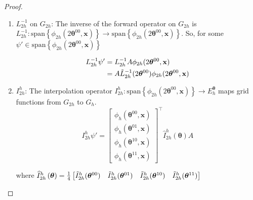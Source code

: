 \documentclass[12pt]{article}
\begin{document}
\begin{proof}
\begin{enumerate}
\begin{align*}
    I^{2h}_h \psi(\mathbf{x}) &= \left(\Tilde{I}_h^{2h}(\boldsymbol{\theta}^{00})A^{00}   +  \Tilde{I}_h^{2h}(\boldsymbol{\theta}^{01})A^{01} + \Tilde{I}_h^{2h}(\boldsymbol{\theta}^{10})A^{10} + \Tilde{I}_h^{2h}(\boldsymbol{\theta}^{11})A^{11} \right) \phi_{2h}(2\boldsymbol{\theta}^{00}, \mathbf{x}) \\
    &= \widehat{I}^{2h}_h(\boldsymbol{\theta}) \begin{bmatrix}
        A^{00}\\
        A^{01}\\
        A^{10}\\
        A^{11}
    \end{bmatrix} \phi_{2h}(2\boldsymbol{\theta}^{00}, \mathbf{x})
\end{align*}
 where $\widehat{I}^{2h}_h(\boldsymbol{\theta}) = \begin{bmatrix}
     \Tilde{I}_h^{2h}(\boldsymbol{\theta}^{00}) & \Tilde{I}_h^{2h}(\boldsymbol{\theta}^{01}) & \Tilde{I}_h^{2h}(\boldsymbol{\theta}^{10}) & \Tilde{I}_h^{2h}(\boldsymbol{\theta}^{11})
 \end{bmatrix}$
    \item $L_{2h}^{-1}$ on $G_{2h}$: The inverse of the forward operator on $G_{2h}$ is $L_{2h}^{-1}: \text{span}\left\{\phi_{2h}(2\boldsymbol{\theta}^{00}, \mathbf{x})\right\}\to \text{span}\left\{\phi_{2h}(2\boldsymbol{\theta}^{00}, \mathbf{x})\right\}$. So, for some $\psi' \in  \text{span}\left\{\phi_{2h}(2\boldsymbol{\theta}^{00}, \mathbf{x})\right\} $ 

\begin{align*}
    L_{2h}^{-1} \psi' &= L_{2h}^{-1}A \phi_{2h}(2\boldsymbol{\theta}^{00}, \mathbf{x}) \\
    &= A \Tilde{L}_{2h}^{-1}(2\boldsymbol{\theta}^{00})\phi_{2h}(2\boldsymbol{\theta}^{00}, \mathbf{x})
\end{align*}

    \item $I^h_{2h}$: The interpolation operator $I^h_{2h}: \text{span}\left\{\phi_{2h}(2\boldsymbol{\theta}^{00}, \mathbf{x})\right\} \to E^{\boldsymbol{\theta}}_h $ maps grid functions from $G_{2h}$ to $G_h$.
$$I^h_{2h} \psi' = \begin{bmatrix}
        \phi_h(\boldsymbol{\theta}^{00}, \mathbf{x})\\
        \phi_h(\boldsymbol{\theta}^{01}, \mathbf{x})\\
        \phi_h(\boldsymbol{\theta}^{10}, \mathbf{x})\\
        \phi_h(\boldsymbol{\theta}^{11}, \mathbf{x})
    \end{bmatrix}^{\top}\widehat{I}^h_{2h}\left(\boldsymbol{\theta}\right)A $$

where $\widehat{I}^h_{2h}\left(\boldsymbol{\theta}\right) = \frac{1}{4}\begin{bmatrix}
    \Tilde{I}_{2h}^{h}(\boldsymbol{\theta}^{00}) & \Tilde{I}_{2h}^{h}(\boldsymbol{\theta}^{01}) & \Tilde{I}_{2h}^{h}(\boldsymbol{\theta}^{10}) & \Tilde{I}_{2h}^{h}(\boldsymbol{\theta}^{11})
\end{bmatrix}$
    \end{enumerate}
\end{proof}
\end{document}
